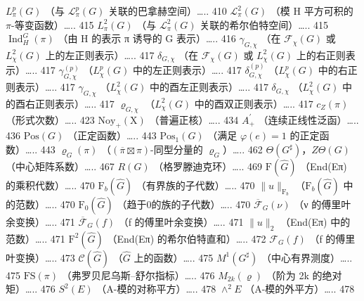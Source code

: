 \(L_{\pi}^{p}(G)\) （与 \(\mathcal{L}_{\pi}^{p}(G)\) 关联的巴拿赫空间）\ldots.. 410 \(\mathcal{L}_{\pi}^{2}(G)\) （模 H 平方可积的 \(\pi\)-等变函数）\ldots.. 415 \(L_{\pi}^{2}(G)\) （与 \(\mathcal{L}_{\pi}^{2}(G)\) 关联的希尔伯特空间）\ldots.. 415 \(\operatorname{Ind}_{H}^{G}(\pi)\) （由 H 的表示 π 诱导的 G 表示）\ldots.. 416 \(\gamma_{G,\chi}\) （在 \(\mathcal{F}_{\chi}(G)\) 或 \(L_{\chi}^{2}(G)\) 上的左正则表示）\ldots.. 417 \(\delta_{G,\chi}\) （在 \(\mathcal{F}_{\chi}(G)\) 或 \(L_{\chi}^{2}(G)\) 上的右正则表示）\ldots.. 417 \(\gamma_{G,\chi}^{(p)}\) （\(L_{\chi}^{p}(G)\) 中的左正则表示）\ldots.. 417 \(\delta_{G,\chi}^{(p)}\) （\(L_{\chi}^{p}(G)\) 中的右正则表示）\ldots.. 417 \(\gamma_{G,\chi}\) （\(L_{\chi}^{2}(G)\) 中的酉左正则表示）\ldots.. 417 \(\delta_{G,\chi}\) （\(L_{\chi}^{2}(G)\) 中的酉右正则表示）\ldots.. 417 \(\varrho_{G,\chi}\) （\(L_{\chi}^{2}(G)\) 中的酉双正则表示）\ldots.. 417 \(c_{Z}(\pi)\) （形式次数）\ldots.. 423 \(\mathrm{Noy}_{+}(\mathrm{X})\) （普遍正核）\ldots.. 434 \(A_{+}^{\prime}\) （连续正线性泛函）\ldots.. 436 \(\mathrm{Pos}(G)\) （正定函数）\ldots.. 443 \(\mathrm{Pos}_{1}(G)\) （满足 \(\varphi(e)=1\) 的正定函数）\ldots.. 443 \(\varrho_{G}(\pi)\) （\((\overline{\pi}\boxtimes\pi)\)-同型分量的 \(\varrho_{G}\)）\ldots.. 462 \(\Theta(G^{\sharp})\)，\(Z\Theta(G)\) （中心矩阵系数）\ldots.. 467 \(R(G)\) （格罗滕迪克环）\ldots.. 469 \(\mathrm{F}(\widehat{G})\) （End(Eπ) 的乘积代数）\ldots.. 470 \(\mathrm{F}_{b}(\widehat{G})\) （有界族的子代数）\ldots.. 470 \(\|u\|_{\mathrm{F}_{b}}\) （\(\mathrm{F}_{b}(\widehat{G})\) 中的范数）\ldots.. 470 \(\mathrm{F}_{0}(\widehat{G})\) （趋于0的族的子代数）\ldots.. 470 \(\overline{\mathcal{F}}_{G}(\nu)\) （ν 的傅里叶余变换）\ldots.. 471 \(\overline{\mathcal{F}}_{G}(f)\) （f 的傅里叶余变换）\ldots.. 471 \(\|u\|_{2}\) （End(Eπ) 中的范数）\ldots.. 471 \(\mathrm{F}^{2}(\widehat{G})\) （End(Eπ) 的希尔伯特直和）\ldots.. 472 \(\mathcal{F}_{G}(f)\) （f 的傅里叶变换）\ldots.. 473 \(\mathcal{C}(\widehat{G})\) （\(\widehat{G}\) 上的函数）\ldots.. 475 \(M^{1}(G^{\sharp})\) （中心有界测度）\ldots.. 475 \(\mathrm{FS}(\pi)\) （弗罗贝尼乌斯--舒尔指标）\ldots.. 476 \(M_{2k}(\varrho)\) （阶为 2k 的绝对矩）\ldots.. 476 \(S^{2}(E)\) （A-模的对称平方）\ldots.. 478 \(\wedge^{2}E\) （A-模的外平方）\ldots.. 478

